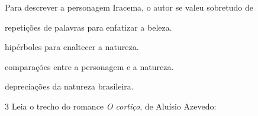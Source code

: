 
Para descrever a personagem Iracema, o autor se valeu sobretudo de

\begin{escolha}

  \item repetições de palavras para enfatizar a beleza. 

  \item hipérboles para enaltecer a natureza.

  \item comparações entre a personagem e a natureza.

  \item depreciações da natureza brasileira.

\end{escolha}

\num{3} Leia o trecho do romance \textit{O cortiço}, de Aluísio Azevedo:



